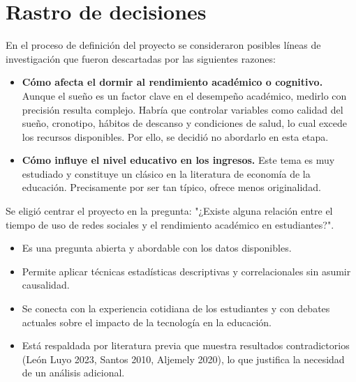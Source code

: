 \documentclass[12pt]{article}
\begin{document}
\section{Rastro de decisiones}
En el proceso de definición del proyecto se consideraron posibles líneas de investigación que fueron descartadas por las siguientes razones:
\begin{itemize}
    \item \textbf{Cómo afecta el dormir al rendimiento académico o cognitivo.} Aunque el sueño es un factor clave en el desempeño académico, medirlo con precisión resulta complejo. Habría que controlar variables como calidad del sueño, cronotipo, hábitos de descanso y condiciones de salud, lo cual excede los recursos disponibles. Por ello, se decidió no abordarlo en esta etapa.

    \item \textbf{Cómo influye el nivel educativo en los ingresos.} Este tema es muy estudiado y constituye un clásico en la literatura de economía de la educación. Precisamente por ser tan típico, ofrece menos originalidad.
\end{itemize}

Se eligió centrar el proyecto en la pregunta:
"¿Existe alguna relación entre el tiempo de uso de redes sociales y el rendimiento académico en estudiantes?".

\begin{itemize}
    \item Es una pregunta abierta y abordable con los datos disponibles.

    \item Permite aplicar técnicas estadísticas descriptivas y correlacionales sin asumir causalidad.

    \item Se conecta con la experiencia cotidiana de los estudiantes y con debates actuales sobre el impacto de la tecnología en la educación.

    \item Está respaldada por literatura previa que muestra resultados contradictorios (León Luyo 2023, Santos 2010, Aljemely 2020), lo que justifica la necesidad de un análisis adicional.
\end{itemize}
\end{document}
